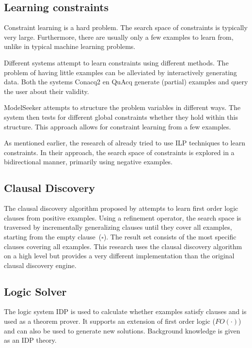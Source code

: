 \documentclass[letterpaper]{article}
\theoremstyle{definition}
\begin{document}
\subsection{Learning constraints}
Constraint learning is a hard problem.
The search space of constraints is typically very large.
Furthermore, there are usually only a few examples to learn from, unlike in typical machine learning problems.

Different systems attempt to learn constraints using different methods.
The problem of having little examples can be alleviated by interactively generating data.
Both the systems Conacq2 \cite{bessiere2007query} en QuAcq \cite{bessiere2013constraint} generate (partial) examples and query the user about their validity.

ModelSeeker \cite{Beldiceanu:ModelSeeker} attempts to structure the problem variables in different ways.
The system then tests for different global constraints whether they hold within this structure.
This approach allows for constraint learning from a few examples.

As mentioned earlier, the research of \cite{Lallouet:LearningCP} already tried to use ILP techniques to learn constraints.
In their approach, the search space of constraints is explored in a bidirectional manner, primarily using negative examples.


\subsection{Clausal Discovery}
The clausal discovery algorithm proposed by \cite{DeRaedt:ClausalDiscovery} attempts to learn first order logic clauses from positive examples.
Using a refinement operator, the search space is traversed by incrementally generalizing clauses until they cover all examples, starting from the empty clause~($\square$).
The result set consists of the most specific clauses covering all examples.
This research uses the clausal discovery algorithm on a high level but provides a very different implementation than the original clausal discovery engine.

\subsection{Logic Solver}
The logic system IDP \cite{de2013prototype,wittocx2008idp} is used to calculate whether examples satisfy clauses and is used as a theorem prover.
It supports an extension of first order logic ($FO(\cdot)$) and can also be used to generate new solutions.
Background knowledge is given as an IDP theory.
\end{document}
